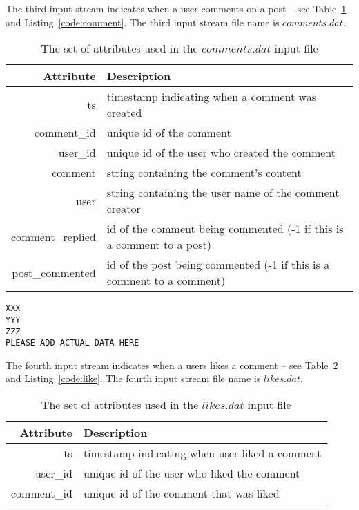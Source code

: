 \documentclass{sig-alternate}
\begin{document}
The third input stream indicates when a user comments on a post -- see Table~\ref{table:comment} and Listing~\ref{code:comment}. The third input stream file name is $comments.dat$.

\begin{table}[ht]
	\caption{The set of attributes used in the $comments.dat$ input file}
	\centering 
	\begin{tabular}{r p{5.2cm}}
		\toprule
		Attribute		&	 Description\\
		\midrule
		ts			&	timestamp indicating when a comment was created\\[2ex]
		comment\_id	&	unique id of the comment\\[2ex]
		user\_id	&	unique id of the user who created the comment\\[2ex]		
		comment		& 	string containing the comment's content\\[2ex]		
		user		&   string containing the user name of the comment creator\\[2ex]
		comment\_replied		&   id of the comment being commented (-1 if this is a comment to a post)\\[2ex]
		post\_commented		&   id of the post being commented (-1 if this is a comment to a comment)\\[2ex]
		\bottomrule 
	\end{tabular}
	\label{table:comment}
\end{table}



\lstset{}
\begin{lstlisting}[float=ht,caption={First line from the $comments.dat$ file -- one attribute per line of listing},label={code:comment}]
XXX
YYY
ZZZ
PLEASE ADD ACTUAL DATA HERE
\end{lstlisting}

The fourth input stream indicates when a users likes a comment -- see Table~\ref{table:like} and Listing~\ref{code:like}. The fourth input stream file name is $likes.dat$.

\begin{table}[ht]
	\caption{The set of attributes used in the $likes.dat$ input file}
	\centering 
	\begin{tabular}{r p{5.2cm}}
		\toprule
		Attribute		&	 Description\\
		\midrule
		ts			&	timestamp indicating when user liked a comment\\[2ex]
		user\_id	&	unique id of the user who liked the comment\\[2ex]		
		comment\_id	& 	unique id of the comment that was liked\\[2ex]		
		\bottomrule 
	\end{tabular}
	\label{table:like}
\end{table}
\end{document}
